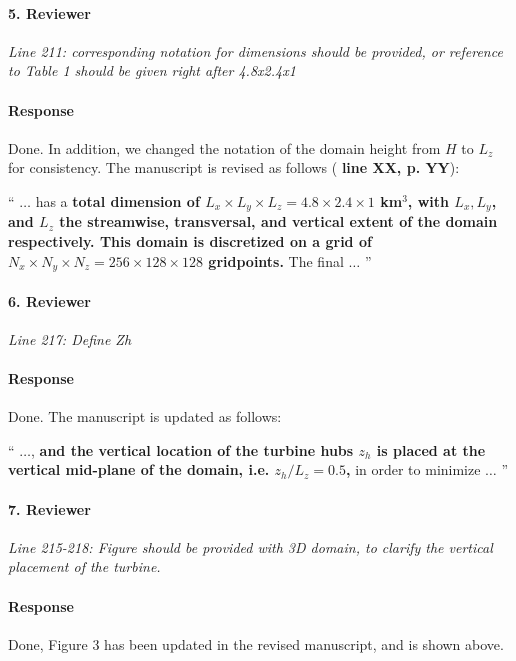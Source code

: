 \documentclass[]{article}
\newcommand{\red}[1]{\textbf{\color{red} #1}}
\newcommand{\revision}[1]{\textbf{#1}}
\begin{document}
\hrulefill

\paragraph{5. Reviewer} \textit{Line 211: corresponding notation for dimensions should be provided, or reference to Table 1 should be given right after 4.8x2.4x1}

\paragraph{Response} Done. In addition, we changed the notation of the domain height from $H$ to $L_z$ for consistency. The manuscript is revised as follows (\red{line XX, p. YY}):

`` 
$\dots$ has a \revision{total dimension of $L_x \times L_y \times L_z = 4.8 \times 2.4 \times 1 $ km$^3$, with $L_x, L_y$, and $L_z$ the streamwise, transversal, and vertical extent of the domain respectively. This domain is discretized on a grid of $N_x \times N_y \times N_z = 256 \times 128 \times 128$ gridpoints.} The final $\dots$
''

\hrulefill

\paragraph{6. Reviewer} \textit{Line 217: Define Zh}

\paragraph{Response} Done. The manuscript is updated as follows:

``
$\dots$, \revision{and the vertical location of the turbine hubs $z_h$ is placed at the vertical mid-plane of the domain, i.e. $z_h/L_z = 0.5$,} in order to minimize $\dots$
''

\hrulefill

\paragraph{7. Reviewer} \textit{Line 215-218: Figure should be provided with 3D domain, to clarify the vertical placement of the turbine.}

\paragraph{Response} Done, Figure 3 has been updated in the revised manuscript, and is shown above.
\end{document}

